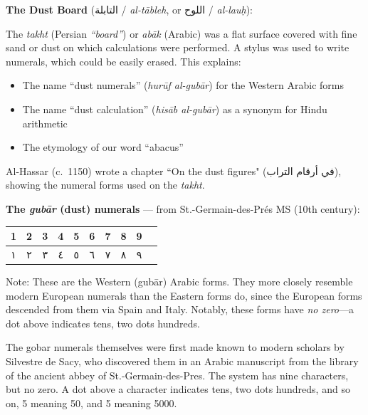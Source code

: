 \documentclass[11pt,a4paper]{article}
\newcommand{\ar}[1]{{\arabicfont #1}}
\newenvironment{arabicpassage}{%
  \begin{tcolorbox}[colback=arabicbg,colframe=rulecolor,boxrule=0.5pt,
    left=8pt,right=8pt,top=6pt,bottom=6pt,fontupper=\arabicfont\large]
}{\end{tcolorbox}}
\newenvironment{enhancednote}{%
  \begin{tcolorbox}[colback=enhancedbg,colframe=notecolor,boxrule=1pt,
    left=10pt,right=10pt,top=8pt,bottom=8pt,
    title={\textbf{Enhanced Edition Note}},fonttitle=\bfseries\color{notecolor}]
}{\end{tcolorbox}}
\begin{document}
\begin{enhancednote}
\textbf{The Dust Board} (\ar{التابلة} / \textit{al-t\=ableh}, or \ar{اللوح} / \textit{al-lau\d{h}}):

The \textit{takht} (Persian \textit{``board''}) or \textit{ab\=ak} (Arabic) was a flat surface covered with fine sand or dust on which calculations were performed. A stylus was used to write numerals, which could be easily erased. This explains:
\begin{itemize}[leftmargin=1.5em,itemsep=0pt]
  \item The name ``dust numerals'' (\textit{hur\=uf al-gub\=ar}) for the Western Arabic forms
  \item The name ``dust calculation'' (\textit{his\=ab al-gub\=ar}) as a synonym for Hindu arithmetic
  \item The etymology of our word ``abacus''
\end{itemize}

Al-Hassar (c.~1150) wrote a chapter ``On the dust figures" (\ar{في أرقام التراب}), showing the numeral forms used on the \textit{takht}.
\end{enhancednote}

\begin{arabicpassage}
\textbf{The \textit{gub\=ar} (dust) numerals} --- from St.-Germain-des-Pr\'{e}s MS (10th century):

\begin{center}
\begin{tabular}{|*{10}{c|}}
\hline
\textbf{1} & \textbf{2} & \textbf{3} & \textbf{4} & \textbf{5} & \textbf{6} & \textbf{7} & \textbf{8} & \textbf{9} \\
\hline
\ar{١} & \ar{٢} & \ar{٣} & \ar{٤} & \ar{٥} & \ar{٦} & \ar{٧} & \ar{٨} & \ar{٩} \\
\hline
\end{tabular}
\end{center}

Note: These are the Western (gub\=ar) Arabic forms. They more closely resemble modern European numerals than the Eastern forms do, since the European forms descended from them via Spain and Italy. Notably, these forms have \textit{no zero}---a dot above indicates tens, two dots hundreds.
\end{arabicpassage}

The gobar numerals themselves were first made known to modern scholars by Silvestre de Sacy, who discovered them in an Arabic manuscript from the library of the ancient abbey of St.-Germain-des-Pres. The system has nine characters, but no zero. A dot above a character indicates tens, two dots hundreds, and so on, 5 meaning 50, and 5 meaning 5000.
\end{document}
